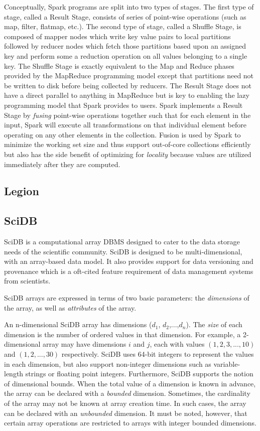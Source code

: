 \documentclass[tog]{acmsiggraph}
\begin{document}
Conceptually, Spark programs are split into two types of stages. The first type
of stage, called a Result Stage, consists of series of point-wise
operations (such as map, filter, flatmap, etc.). The second type of stage,
called a Shuffle Stage, is composed of mapper nodes which write key
value pairs to local partitions followed by reducer nodes which fetch those
partitions based upon an assigned key and perform some a reduction operation on
all values belonging to a single key. The Shuffle Stage is exactly equivalent
to the Map and Reduce phases provided by the MapReduce programming model except
that partitions need not be written to disk before being collected by
reducers. The Result Stage does not have a direct parallel to anything in
MapReduce but is key to enabling the lazy programming model that Spark provides
to users. Spark implements a Result Stage by \textit{fusing} point-wise
operations together such that for each element in the input, Spark will execute
all transformations on that individual element before operating on any other
elements in the collection. Fusion is used by Spark to minimize the working set
size and thus support out-of-core collections efficiently but also has the side
benefit of optimizing for \textit{locality} because values are utilized
immediately after they are computed.


\subsection{Legion}

\subsection{SciDB}
SciDB\cite{stonebraker2013scidb} is a computational array DBMS designed to
cater to the data storage needs of the scientific community. SciDB is designed
to be multi-dimensional, with an array-based data model. It also provides
support for data versioning and provenance which is a oft-cited feature
requirement of data management systems from scientists.

SciDB arrays are expressed in terms of two basic parameters: the {\em
dimensions} of the array, as well as {\em attributes} of the array.

An n-dimensional SciDB array has dimensions ($d_{1}$,
$d_{2}$,$...$,$d_{n}$). The {\em size} of each dimension is the number of
ordered values in that dimension. For example, a 2-dimensional array may have
dimensions $i$ and $j$, each with values $(1, 2, 3, ..., 10)$ and $(1, 2, ...,
30)$ respectively. SciDB uses 64-bit integers to represent the values in each
dimension, but also support non-integer dimensions such as variable-length
strings or floating point integers. Furthermore, SciDB supports the notion of
dimensional bounds. When the total value of a dimension is known in advance,
the array can be declared with a {\em bounded} dimension. Sometimes, the
cardinality of the array may not be known at array creation time. In such
cases, the array can be declared with an {\em unbounded} dimension. It must be
noted, however, that certain array operations are restricted to arrays with
integer bounded dimensions.
\end{document}
